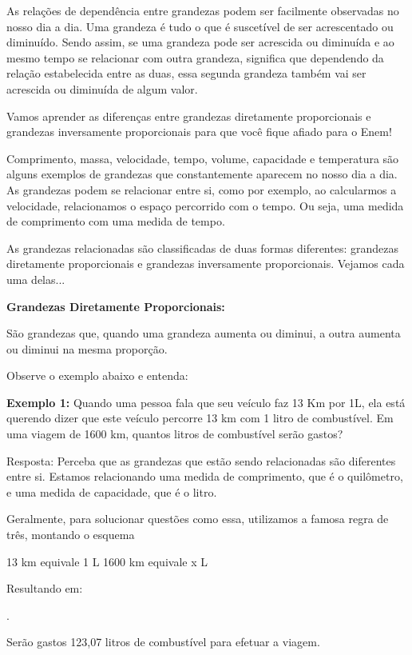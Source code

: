 \begin{multicols*}{2}
As relações de dependência entre grandezas podem ser facilmente observadas no nosso dia a dia. Uma grandeza é tudo o que é suscetível de ser acrescentado ou diminuído. Sendo assim, se uma grandeza pode ser acrescida ou diminuída e ao mesmo tempo se relacionar com outra grandeza, significa que dependendo da relação estabelecida entre as duas, essa segunda grandeza também vai ser acrescida ou diminuída de algum valor.

Vamos aprender as diferenças entre grandezas diretamente proporcionais e grandezas inversamente proporcionais para que você fique afiado para o Enem!

Comprimento, massa, velocidade, tempo, volume, capacidade e temperatura são alguns exemplos de grandezas que constantemente aparecem no nosso dia a dia. As grandezas podem se relacionar entre si,  como por exemplo, ao calcularmos a velocidade, relacionamos o espaço percorrido com o tempo. Ou seja, uma medida de comprimento com uma medida de tempo.	

As grandezas relacionadas são classificadas de duas formas diferentes: grandezas diretamente proporcionais  e grandezas inversamente proporcionais. Vejamos cada uma delas...
	
\textbf{Grandezas Diretamente Proporcionais:}

São grandezas que, quando uma grandeza aumenta ou diminui, a outra aumenta ou diminui na mesma proporção.

Observe o exemplo abaixo e entenda:

\textbf{Exemplo 1:} Quando uma pessoa fala que seu veículo faz 13 Km por 1L, ela está querendo dizer que este veículo percorre 13 km com 1 litro de combustível. Em uma viagem de 1600 km, quantos litros de combustível serão gastos?

Resposta: Perceba que as grandezas que estão sendo relacionadas são diferentes entre si. Estamos relacionando uma medida de comprimento, que é o quilômetro, e uma medida de capacidade, que é o litro.

Geralmente, para solucionar questões como essa, utilizamos a famosa regra de três, montando o esquema

13 km   equivale 1 L
1600 km equivale x L

Resultando em:


.

Serão gastos 123,07 litros de combustível para efetuar a viagem.


\end{multicols*}
